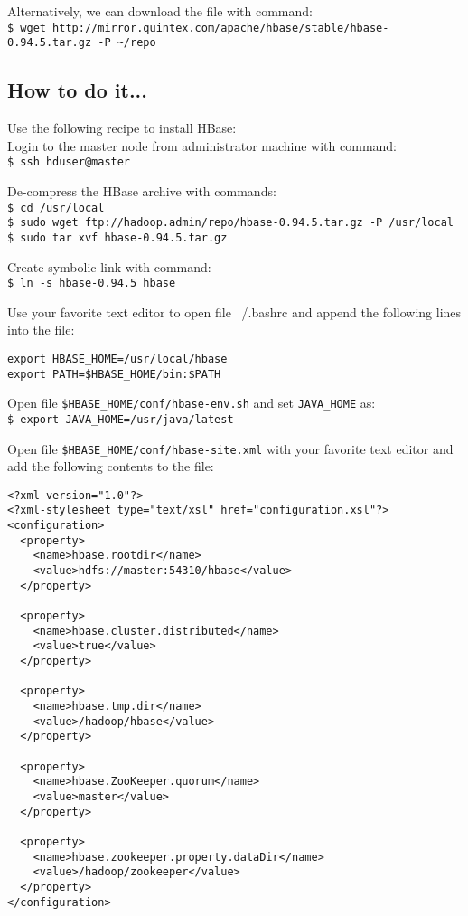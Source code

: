 Alternatively, we can download the file with command: \\
\verb|$ wget http://mirror.quintex.com/apache/hbase/stable/hbase-0.94.5.tar.gz -P ~/repo|

\subsection*{How to do it...}
Use the following recipe to install HBase: \\
Login to the master node from administrator machine with command: \\
\verb|$ ssh hduser@master|

De-compress the HBase archive with commands: \\
\verb|$ cd /usr/local| \\
\verb|$ sudo wget ftp://hadoop.admin/repo/hbase-0.94.5.tar.gz -P /usr/local | \\
\verb|$ sudo tar xvf hbase-0.94.5.tar.gz |

Create symbolic link with command: \\
\verb|$ ln -s hbase-0.94.5 hbase|

Use your favorite text editor to open file ~/.bashrc and append the following lines into the file:
\begin{verbatim}
export HBASE_HOME=/usr/local/hbase
export PATH=$HBASE_HOME/bin:$PATH
\end{verbatim}

Open file \verb|$HBASE_HOME/conf/hbase-env.sh| and set \verb|JAVA_HOME| as: \\
\verb|$ export JAVA_HOME=/usr/java/latest|

Open file \verb|$HBASE_HOME/conf/hbase-site.xml| with your favorite text editor and add the following contents to the file:
\begin{verbatim}
<?xml version="1.0"?>
<?xml-stylesheet type="text/xsl" href="configuration.xsl"?>
<configuration>
  <property>
    <name>hbase.rootdir</name>
    <value>hdfs://master:54310/hbase</value>
  </property>

  <property>
    <name>hbase.cluster.distributed</name>
    <value>true</value>
  </property>

  <property>
    <name>hbase.tmp.dir</name>
    <value>/hadoop/hbase</value>
  </property>

  <property>
    <name>hbase.ZooKeeper.quorum</name>
    <value>master</value>
  </property>

  <property>
    <name>hbase.zookeeper.property.dataDir</name>
    <value>/hadoop/zookeeper</value>
  </property>
</configuration>
\end{verbatim}

